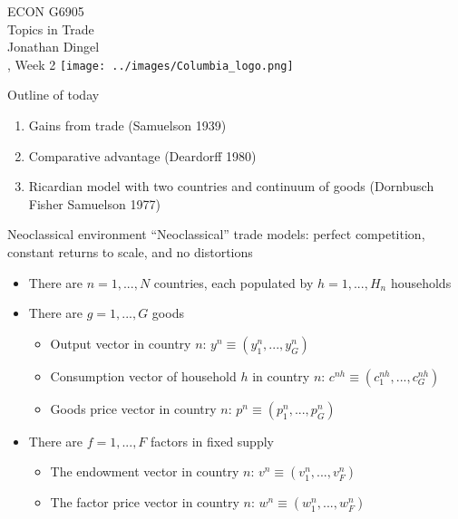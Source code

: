 \documentclass[11pt,notes=hide,aspectratio=169]{beamer}
\begin{document}
\begin{frame}[plain]
\begin{center}
\large
\textcolor{columbiadarkblue}{ECON G6905\\
Topics in Trade\\ 
Jonathan Dingel\\
\semester, Week 2}
\vfill 
\texttt{[image: ../images/Columbia\_logo.png]}
\end{center}
\end{frame}
\begin{frame}{Outline of today}
\begin{enumerate}
	\item Gains from trade (Samuelson 1939)
	\item Comparative advantage (Deardorff 1980)
	\item Ricardian model with two countries and continuum of goods (Dornbusch Fisher Samuelson 1977)
\end{enumerate}
\end{frame}
\begin{frame}{Neoclassical environment}
``Neoclassical'' trade models: perfect competition, constant returns to scale, and no distortions
\begin{itemize}
\item There are $n=1,...,N$ countries, each populated by $h=1,...,H_{n}$
households
\item There are $g=1,...,G$ goods
\begin{itemize}
\item Output vector in country $n$:
$y^{n} \equiv \left(y_{1}^{n},...,y_{G}^{n}\right) $
\item Consumption vector of household $h$ in country $n$:
$c^{nh} \equiv \left(c_{1}^{nh},...,c_{G}^{nh}\right) $
\item Goods price vector in country $n$:
$p^{n} \equiv \left(p_{1}^{n},...,p_{G}^{n}\right) $
\end{itemize}
\item There are $f=1,...,F$ factors in fixed supply
\begin{itemize}
\item The endowment vector in country $n$:
$v^{n} \equiv \left(v_{1}^{n},...,v_{F}^{n}\right) $
\item The factor price vector in country $n$:
$w^{n} \equiv \left(w_{1}^{n},...,w_{F}^{n}\right) $
\end{itemize}
\end{itemize}
\end{frame}
\end{document}
